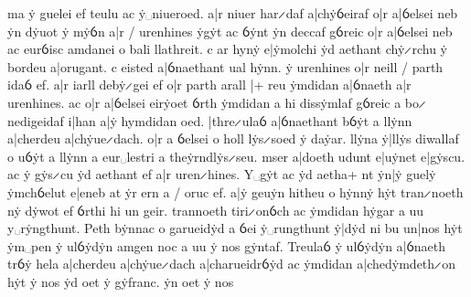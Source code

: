 	ma ẏ guelei ef teulu ac
	ẏ␣niueroed. a|r niuer har ̷
	daf a|chẏỽeiraf o|r a|ỽelsei
	neb ẏn dẏuot ẏ mẏỽn a|r /
	urenhines ẏgẏt ac ỽẏnt
	ẏn deccaf gỽreic o|r a|ỽelsei
	neb ac eurỽisc amdanei
	o bali llathreit. c ar hynẏ
	e|ẏmolchi ẏd aethant  chẏ ̷
	rchu ẏ bordeu a|orugant.
	c eisted a|ỽnaethant ual
	hẏnn. ẏ urenhines o|r neill /
	parth idaỽ ef. a|r iarll debẏ ̷
	gei ef o|r parth arall |+
	reu ẏmdidan a|ỽnaeth 
	a|r urenhines. ac o|r a|ỽelsei
	eirẏoet ỽrth ẏmdidan a
	hi dissẏmlaf gỽreic a bo ̷
	nedigeidaf i|han
	a|ẏ hymdidan oed. |thre ̷
	ulaỽ a|ỽnaethant bỽẏt
	a llẏnn a|cherdeu a|chẏue ̷
	dach. o|r a ỽelsei o holl lẏs ̷
	soed ẏ daẏar. llẏna ẏ|llẏs
	diwallaf o uỽẏt a llẏnn
	a eur␣lestri a theẏrndlẏs ̷
	seu. mser a|doeth udunt
	e|uẏnet e|gẏscu. ac ẏ gẏs ̷
	cu ẏd aethant ef a|r uren ̷
	hines. Y␣gẏt ac ẏd aetha+
	nt ẏn|ẏ guelẏ ẏmchỽelut
	e|eneb at ẏr ern a /
	oruc ef. a|ẏ geuẏn 
	hitheu o hẏnnẏ hẏt tran ̷
	noeth nẏ dẏwot ef ỽrthi
	hi un geir. trannoeth tiri ̷
	onỽch ac ẏmdidan hẏgar
	a uu y␣rẏngthunt. Peth
	bẏnnac o garueidẏd
	a ỽei ẏ␣rungthunt ẏ|dẏd
	ni bu un|nos hẏt ẏm␣pen
	ẏ ulỽẏdẏn amgen noc a
	uu ẏ nos gẏntaf. Treulaỽ
	ẏ ulỽẏdẏn a|ỽnaeth trỽẏ
	hela a|cherdeu a|chẏue ̷
	dach a|charueidrỽẏd ac
	ẏmdidan a|chedẏmdeth ̷
	on hẏt ẏ nos ẏd oet ẏ
	gẏfranc. ẏn oet ẏ nos
